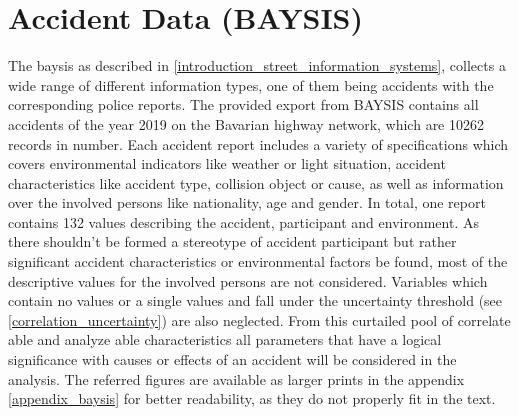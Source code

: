 \section{Accident Data (BAYSIS)}
\label{dataset_baysis}
The \acrfull{baysis} as described in \cref{introduction_street_information_systems}, collects a wide range of different information types, one of them being accidents with the corresponding police reports. The provided export from BAYSIS contains all accidents of the year 2019 on the Bavarian highway network, which are 10262 records in number. Each accident report includes a variety of specifications which covers environmental indicators like weather or light situation, accident characteristics like accident type, collision object or cause, as well as information over the involved persons like nationality, age and gender. In total, one report contains 132 values describing the accident, participant and environment. As there shouldn't be formed a stereotype of accident participant but rather significant accident characteristics or environmental factors be found, most of the descriptive values for the involved persons are not considered. Variables which contain no values or a single values and fall under the uncertainty threshold (see \cref{correlation_uncertainty}) are also neglected. From this curtailed pool of correlate able and analyze able characteristics all parameters that have a logical significance with causes or effects of an accident will be considered in the analysis. The referred figures are available as larger prints in the appendix \cref{appendix_baysis} for better readability, as they do not properly fit in the text. 

